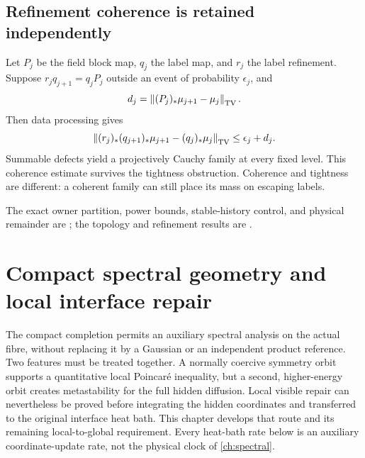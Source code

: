 \documentclass[11pt,oneside,openany]{book}
\theoremstyle{definition}
\theoremstyle{remark}
\newcommand{\norm}[1]{\left\lVert#1\right\rVert}
\newcommand{\src}[2]{\cite[#2]{#1}}
\newcommand{\sourcebasis}[1]{\par\smallskip\noindent #1\par}
\begin{document}
\section{Refinement coherence is retained independently}
Let $P_j$ be the field block map, $q_j$ the label map, and $r_j$ the label refinement. Suppose $r_jq_{j+1}=q_jP_j$ outside an event of probability $\epsilon_j$, and
\[
d_j=\norm{(P_j)_*\mu_{j+1}-\mu_j}_{\rm TV}.
\]
Then data processing gives
\begin{equation}\label{eq:label-TV}
\norm{(r_j)_*(q_{j+1})_*\mu_{j+1}-(q_j)_*\mu_j}_{\rm TV}
\le\epsilon_j+d_j.
\end{equation}
Summable defects yield a projectively Cauchy family at every fixed level. This coherence estimate survives the tightness obstruction. Coherence and tightness are different: a coherent family can still place its mass on escaping labels. \src{PAR}{V5}
\sourcebasis{The exact owner partition, power bounds, stable-history control, and physical remainder are \src{PAR}{V1--V4}; the topology and refinement results are \src{PAR}{V5}.}

\chapter{Compact spectral geometry and local interface repair}
\label{ch:compact-repair}
The compact completion permits an auxiliary spectral analysis on the
actual fibre, without replacing it by a Gaussian or an independent
product reference. Two features must be treated together. A normally
coercive symmetry orbit supports a quantitative local Poincar\'e
inequality, but a second, higher-energy orbit creates metastability
for the full hidden diffusion. Local visible repair can nevertheless
be proved before integrating the hidden coordinates and transferred
to the original interface heat bath. This chapter develops that route
and its remaining local-to-global requirement. Every heat-bath rate
below is an auxiliary coordinate-update rate, not the physical clock
of \cref{ch:spectral}.
\end{document}

